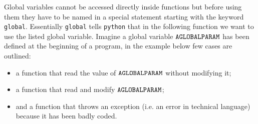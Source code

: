 Global variables cannot be accessed directly inside functions but before using them they 
have to be named in a special statement starting with the keyword \texttt{global}. 
Essentially \texttt{global} tells \texttt{python} that in the following function we want to 
use the listed global variable.
Imagine a global variable $\tt{AGLOBALPARAM}$ has been defined at the beginning of a program, 
in the example below few cases are outlined:
\begin {itemize}
\tightlist
\item a function that read the value of $\tt{AGLOBALPARAM}$ without modifying it;
\item a function that read and modify $\tt{AGLOBALPARAM}$;
\item and a function that throws an exception (i.e. an error in technical language) because it has been badly coded.
\end{itemize}

